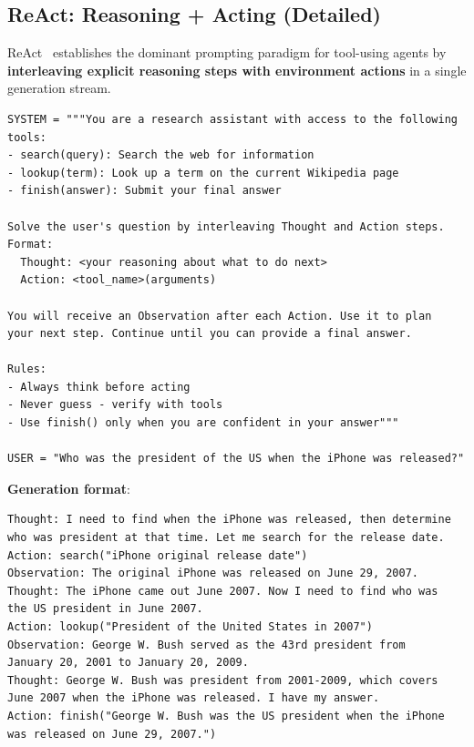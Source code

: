 \subsection{ReAct: Reasoning + Acting (Detailed)}
\label{react-reasoning-acting-detailed}

ReAct~\cite{yao2023react} establishes the dominant prompting paradigm for tool-using agents by \textbf{interleaving explicit reasoning steps with environment actions} in a single generation stream.

\begin{examplebox}
\begin{lstlisting}[style=pythonstyle]
SYSTEM = """You are a research assistant with access to the following tools:
- search(query): Search the web for information
- lookup(term): Look up a term on the current Wikipedia page
- finish(answer): Submit your final answer

Solve the user's question by interleaving Thought and Action steps.
Format:
  Thought: <your reasoning about what to do next>
  Action: <tool_name>(arguments)

You will receive an Observation after each Action. Use it to plan
your next step. Continue until you can provide a final answer.

Rules:
- Always think before acting
- Never guess - verify with tools
- Use finish() only when you are confident in your answer"""

USER = "Who was the president of the US when the iPhone was released?"
\end{lstlisting}
\end{examplebox}

\textbf{Generation format}:

\begin{examplebox}
\begin{lstlisting}[style=pythonstyle]
Thought: I need to find when the iPhone was released, then determine
who was president at that time. Let me search for the release date.
Action: search("iPhone original release date")
Observation: The original iPhone was released on June 29, 2007.
Thought: The iPhone came out June 2007. Now I need to find who was
the US president in June 2007.
Action: lookup("President of the United States in 2007")
Observation: George W. Bush served as the 43rd president from
January 20, 2001 to January 20, 2009.
Thought: George W. Bush was president from 2001-2009, which covers
June 2007 when the iPhone was released. I have my answer.
Action: finish("George W. Bush was the US president when the iPhone
was released on June 29, 2007.")
\end{lstlisting}
\end{examplebox}

